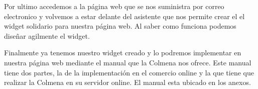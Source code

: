 

Por ultimo accedemos a la página web que se nos suministra por correo electronico y volvemos a estar delante del asistente que nos permite crear el el widget solidario para nuestra página web. Al saber como funciona podemos diseñar agilmente el widget. 


Finalmente ya tenemos nuestro widget creado y lo podremos implementar en nuestra página web mediante el manual que la Colmena nos ofrece. Este manual tiene dos partes, la de la implementación en el comercio online y la que tiene que realizar la Colmena en su servidor online. El manual esta ubicado en los anexos.